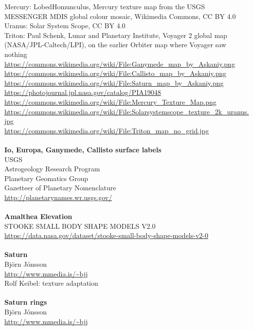 \documentclass[Orbiter User Manual.tex]{subfiles}
\begin{document}
Mercury: LobedHomunculus, Mercury texture map from the USGS MESSENGER MDIS global colour mosaic, Wikimedia Commons, CC BY 4.0\\
Uranus: Solar System Scope, CC BY 4.0\\
Triton: Paul Schenk, Lunar and Planetary Institute, Voyager 2 global map (NASA/JPL-Caltech/LPI), on the earlier Orbiter map where Voyager saw nothing\\
\url{https://commons.wikimedia.org/wiki/File:Ganymede_map_by_Askaniy.png}\\
\url{https://commons.wikimedia.org/wiki/File:Callisto_map_by_Askaniy.png}\\
\url{https://commons.wikimedia.org/wiki/File:Saturn_map_by_Askaniy.png}\\
\url{https://photojournal.jpl.nasa.gov/catalog/PIA19048}\\
\url{https://commons.wikimedia.org/wiki/File:Mercury_Texture_Map.png}\\
\url{https://commons.wikimedia.org/wiki/File:Solarsystemscope_texture_2k_uranus.jpg}\\
\url{https://commons.wikimedia.org/wiki/File:Triton_map_no_grid.jpg}\\
\\
\textbf{Io, Europa, Ganymede, Callisto surface labels}\\
USGS\\
Astrogeology Research Program\\
Planetary Geomatics Group\\
Gazetteer of Planetary Nomenclature\\
\url{http://planetarynames.wr.usgs.gov/}\\
\\
\textbf{Amalthea Elevation}\\
STOOKE SMALL BODY SHAPE MODELS V2.0 \\
\url{https://data.nasa.gov/dataset/stooke-small-body-shape-models-v2-0}\\
\\
\textbf{Saturn}\\
Björn Jónsson\\
\url{http://www.mmedia.is/~bjj}\\
Rolf Keibel: texture adaptation\\
\\
\textbf{Saturn rings}\\
Björn Jónsson\\
\url{http://www.mmedia.is/~bjj}\\
\\
\end{document}
